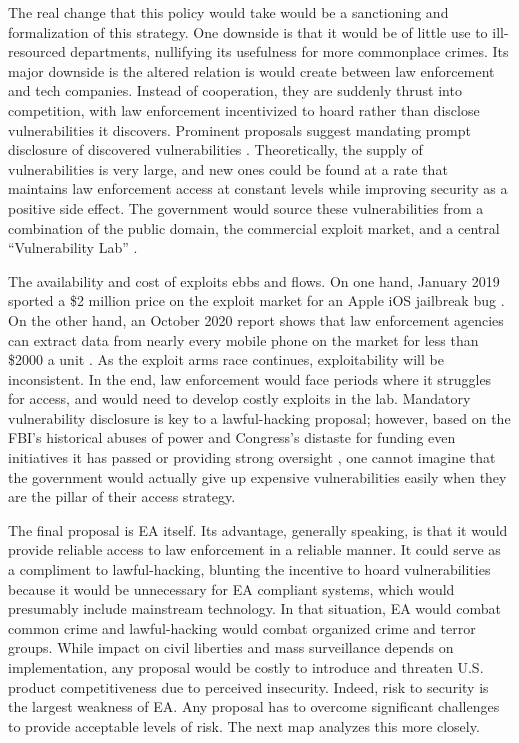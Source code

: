 The real change that this policy would take would be a sanctioning and formalization of this strategy. One downside is
that it would be of little use to ill-resourced departments, nullifying its usefulness for more commonplace crimes. Its
major downside is the altered relation is would create between law enforcement and tech companies. Instead of
cooperation, they are suddenly thrust into competition, with law enforcement incentivized to hoard rather than disclose
vulnerabilities it discovers. Prominent proposals suggest mandating prompt disclosure of discovered vulnerabilities
\cite{bellovin_lawful_2013} \cite{hennessey_lawful_2016}. Theoretically, the supply of vulnerabilities is very large,
and new ones could be found at a rate that maintains law enforcement access at constant levels while improving security
as a positive side effect. The government would source these vulnerabilities from a combination of the public domain,
the commercial exploit market, and a central ``Vulnerability Lab'' \cite{bellovin_lawful_2013}.

The availability and cost of exploits ebbs and flows. On one hand, January 2019 sported a \$2 million price on the
exploit market for an Apple iOS jailbreak bug \cite{goodin_zeroday_2019}. On the other hand, an October 2020 report
shows that law enforcement agencies can extract data from nearly every mobile phone on the market for less than \$2000 a
unit \cite{koepke_2020}. As the exploit arms race continues, exploitability will be inconsistent. In the end, law
enforcement would face periods where it struggles for access, and would need to develop costly exploits in the lab.
Mandatory vulnerability disclosure is key to a \ac{lawful-hacking} proposal; however, based on the \ac{FBI}'s historical
abuses of power \cite{shamsi_2011} and Congress's distaste for funding even initiatives it has passed
\cite{keller_internet_2019} or providing strong oversight \cite{johnson_congressional_2004}, one cannot imagine that the
government would actually give up expensive vulnerabilities easily when they are the pillar of their access strategy.

The final proposal is \ac{EA} itself. Its advantage, generally speaking, is that it would provide reliable access to law
enforcement in a reliable manner. It could serve as a compliment to \ac{lawful-hacking}, blunting the incentive to hoard
vulnerabilities because it would be unnecessary for \ac{EA} compliant systems, which would presumably include mainstream
technology. In that situation, \ac{EA} would combat common crime and \ac{lawful-hacking} would combat organized crime
and terror groups. While impact on civil liberties and mass surveillance depends on implementation, any proposal would
be costly to introduce and threaten U.S. product competitiveness due to perceived insecurity. Indeed, risk to security
is the largest weakness of \ac{EA}. Any proposal has to overcome significant challenges to provide acceptable levels of
risk. The next map analyzes this more closely.


